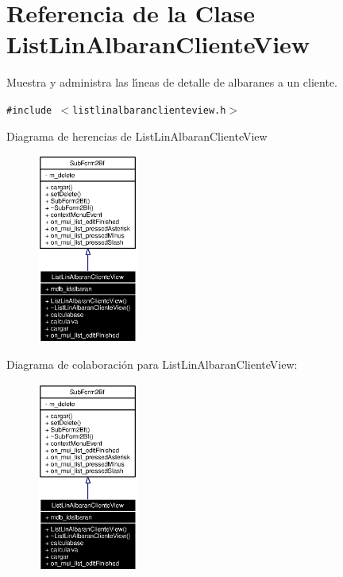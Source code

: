 \section{Referencia de la Clase List\-Lin\-Albaran\-Cliente\-View}
\label{classListLinAlbaranClienteView}
Muestra y administra las l\'{\i}neas de detalle de albaranes a un cliente.  


{\tt \#include $<$listlinalbaranclienteview.h$>$}

Diagrama de herencias de List\-Lin\-Albaran\-Cliente\-View\begin{figure}[H]
\begin{center}
\leavevmode
\includegraphics[width=94pt]{classListLinAlbaranClienteView__inherit__graph}
\end{center}
\end{figure}
Diagrama de colaboraci\'{o}n para List\-Lin\-Albaran\-Cliente\-View:\begin{figure}[H]
\begin{center}
\leavevmode
\includegraphics[width=94pt]{classListLinAlbaranClienteView__coll__graph}
\end{center}
\end{figure}
